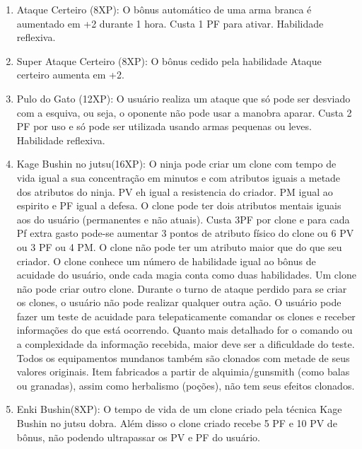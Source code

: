 \begin{enumerate}
	\item Ataque Certeiro (8XP): O bônus automático de uma arma branca é aumentado em +2 durante 1 hora. Custa 1 PF para ativar. Habilidade reflexiva.
	
	\item Super Ataque Certeiro (8XP): O bônus cedido pela habilidade Ataque certeiro aumenta em +2. 
	
	\item Pulo do Gato (12XP): O usuário realiza um ataque que só pode ser desviado com a esquiva, ou seja, o oponente não pode usar a manobra aparar. Custa 2 PF por uso e só pode ser utilizada usando armas pequenas ou leves. Habilidade reflexiva.


	\item Kage Bushin no jutsu(16XP): O ninja pode criar um clone com tempo de vida igual a sua concentração em minutos e com atributos iguais a metade dos atributos do ninja. PV eh igual a resistencia do criador. PM igual ao espirito e PF igual a defesa. O clone pode ter dois atributos mentais iguais aos do usuário (permanentes e não atuais). Custa 3PF por clone e para cada Pf extra gasto pode-se aumentar 3 pontos de atributo físico do clone ou 6 PV ou 3 PF ou 4 PM. O clone não pode ter um atributo maior que do que seu criador. O clone conhece um número de habilidade igual ao bônus de acuidade do usuário, onde cada magia conta como duas habilidades. Um clone não pode criar outro clone. Durante o turno de ataque perdido para se criar os clones, o usuário não pode realizar qualquer outra ação. O usuário pode fazer um teste de acuidade para telepaticamente comandar os clones e receber informações do que está ocorrendo. Quanto mais detalhado for o comando ou a complexidade da informação recebida, maior deve ser a dificuldade do teste. Todos os equipamentos mundanos também são clonados com metade de seus valores originais. Item fabricados a partir de alquimia/gunsmith (como balas ou granadas), assim como herbalismo (poções), não tem seus efeitos clonados.
		
	\item Enki Bushin(8XP): O tempo de vida de um clone criado pela técnica Kage Bushin no jutsu dobra. Além disso o clone criado recebe 5 PF e 10 PV de bônus, não podendo ultrapassar os PV e PF do usuário.
	

\end{enumerate}
